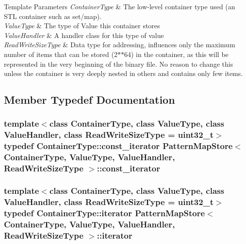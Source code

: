 \begin{DoxyTemplParams}{Template Parameters}
{\em Container\+Type} & The low-\/level container type used (an S\+T\+L container such as set/map). \\
\hline
{\em Value\+Type} & The type of Value this container stores \\
\hline
{\em Value\+Handler} & A handler class for this type of value \\
\hline
{\em Read\+Write\+Size\+Type} & Data type for addressing, influences only the maximum number of items that can be stored (2$\ast$$\ast$64) in the container, as this will be represented in the very beginning of the binary file. No reason to change this unless the container is very deeply nested in others and contains only few items. \\
\hline
\end{DoxyTemplParams}


\subsection{Member Typedef Documentation}
\hypertarget{classPatternMapStore_a41a18b827340283e8a643a1d526320f4}{}
\subsubsection[{const\+\_\+iterator}]{\setlength{\rightskip}{0pt plus 5cm}template$<$class Container\+Type, class Value\+Type, class Value\+Handler, class Read\+Write\+Size\+Type = uint32\+\_\+t$>$ typedef Container\+Type\+::const\+\_\+iterator {\bf Pattern\+Map\+Store}$<$ Container\+Type, Value\+Type, Value\+Handler, Read\+Write\+Size\+Type $>$\+::{\bf const\+\_\+iterator}}\label{classPatternMapStore_a41a18b827340283e8a643a1d526320f4}
\hypertarget{classPatternMapStore_a918b5de9d2deb6fcc2080a0bb9f53877}{}
\subsubsection[{iterator}]{\setlength{\rightskip}{0pt plus 5cm}template$<$class Container\+Type, class Value\+Type, class Value\+Handler, class Read\+Write\+Size\+Type = uint32\+\_\+t$>$ typedef Container\+Type\+::iterator {\bf Pattern\+Map\+Store}$<$ Container\+Type, Value\+Type, Value\+Handler, Read\+Write\+Size\+Type $>$\+::{\bf iterator}}\label{classPatternMapStore_a918b5de9d2deb6fcc2080a0bb9f53877}


